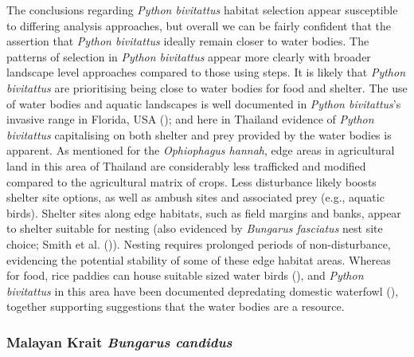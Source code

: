 \documentclass[10pt,a4paper]{article}
\begin{document}
The conclusions regarding \emph{Python bivitattus} habitat selection appear susceptible to differing analysis approaches, but overall we can be fairly confident that the assertion that \emph{Python bivitattus} ideally remain closer to water bodies.
The patterns of selection in \emph{Python bivitattus} appear more clearly with broader landscape level approaches compared to those using steps.
It is likely that \emph{Python bivitattus} are prioritising being close to water bodies for food and shelter.
The use of water bodies and aquatic landscapes is well documented in \emph{Python bivitattus}'s invasive range in Florida, USA (); and here in Thailand evidence of \emph{Python bivitattus} capitalising on both shelter and prey provided by the water bodies is apparent.
As mentioned for the \emph{Ophiophagus hannah}, edge areas in agricultural land in this area of Thailand are considerably less trafficked and modified compared to the agricultural matrix of crops.
Less disturbance likely boosts shelter site options, as well as ambush sites and associated prey (e.g., aquatic birds).
Shelter sites along edge habitats, such as field margins and banks, appear to shelter suitable for nesting (also evidenced by \emph{Bungarus fasciatus} nest site choice; Smith et al. ()).
Nesting requires prolonged periods of non-disturbance, evidencing the potential stability of some of these edge habitat areas.
Whereas for food, rice paddies can house suitable sized water birds (), and \emph{Python bivitattus} in this area have been documented depredating domestic waterfowl (), together supporting suggestions that the water bodies are a resource.

\subsubsection{\texorpdfstring{Malayan Krait \emph{Bungarus candidus}}{Malayan Krait Bungarus candidus}}\label{malayan-krait-bungarus-candidus}
\end{document}
